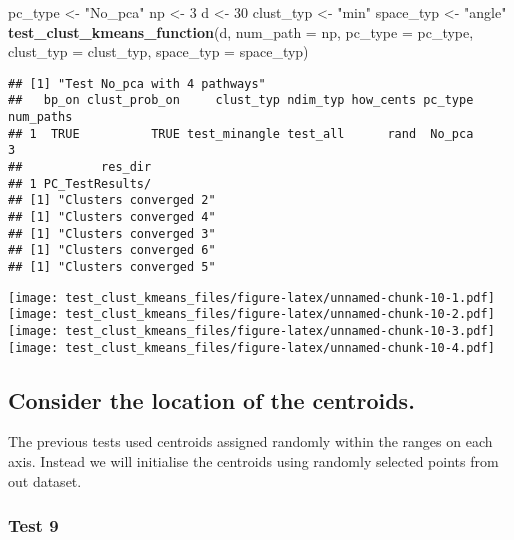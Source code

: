 \documentclass[
]{article}
\newenvironment{Shaded}{\begin{snugshade}}{\end{snugshade}}
\newcommand{\AttributeTok}[1]{\textcolor[rgb]{0.13,0.29,0.53}{#1}}
\newcommand{\DecValTok}[1]{\textcolor[rgb]{0.00,0.00,0.81}{#1}}
\newcommand{\FunctionTok}[1]{\textcolor[rgb]{0.13,0.29,0.53}{\textbf{#1}}}
\newcommand{\NormalTok}[1]{#1}
\newcommand{\OtherTok}[1]{\textcolor[rgb]{0.56,0.35,0.01}{#1}}
\newcommand{\StringTok}[1]{\textcolor[rgb]{0.31,0.60,0.02}{#1}}
\begin{document}
\begin{Shaded}
\begin{Highlighting}[]
\NormalTok{pc\_type }\OtherTok{\textless{}{-}} \StringTok{"No\_pca"}
\NormalTok{np }\OtherTok{\textless{}{-}} \DecValTok{3}
\NormalTok{d }\OtherTok{\textless{}{-}} \DecValTok{30}
\NormalTok{clust\_typ }\OtherTok{\textless{}{-}} \StringTok{"min"}
\NormalTok{space\_typ }\OtherTok{\textless{}{-}} \StringTok{"angle"}
\FunctionTok{test\_clust\_kmeans\_function}\NormalTok{(d,}
                           \AttributeTok{num\_path =}\NormalTok{ np,}
                           \AttributeTok{pc\_type =}\NormalTok{ pc\_type,}
                           \AttributeTok{clust\_typ =}\NormalTok{ clust\_typ,}
                           \AttributeTok{space\_typ =}\NormalTok{ space\_typ)}
\end{Highlighting}
\end{Shaded}

\begin{verbatim}
## [1] "Test No_pca with 4 pathways"
##   bp_on clust_prob_on     clust_typ ndim_typ how_cents pc_type num_paths
## 1  TRUE          TRUE test_minangle test_all      rand  No_pca         3
##           res_dir
## 1 PC_TestResults/
## [1] "Clusters converged 2"
## [1] "Clusters converged 4"
## [1] "Clusters converged 3"
## [1] "Clusters converged 6"
## [1] "Clusters converged 5"
\end{verbatim}

\texttt{[image: test\_clust\_kmeans\_files/figure-latex/unnamed-chunk-10-1.pdf]}
\texttt{[image: test\_clust\_kmeans\_files/figure-latex/unnamed-chunk-10-2.pdf]}
\texttt{[image: test\_clust\_kmeans\_files/figure-latex/unnamed-chunk-10-3.pdf]}
\texttt{[image: test\_clust\_kmeans\_files/figure-latex/unnamed-chunk-10-4.pdf]}

\hypertarget{consider-the-location-of-the-centroids.}{%
\subsection{Consider the location of the
centroids.}\label{consider-the-location-of-the-centroids.}}

The previous tests used centroids assigned randomly within the ranges on
each axis. Instead we will initialise the centroids using randomly
selected points from out dataset.

\hypertarget{test-9}{%
\subsubsection{Test 9}\label{test-9}}
\end{document}
